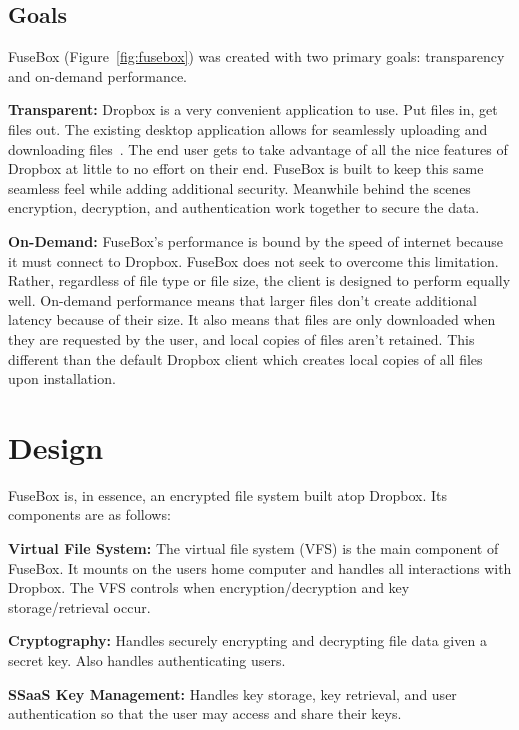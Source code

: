 \documentclass[11pt,twocolumn,letterpaper]{article}
\newcommand{\appname}{FuseBox }
\newcommand{\appnameWOspace}{FuseBox}
\begin{document}
\subsection{Goals}
\label{sec:goals}
\appname (Figure~\ref{fig:fusebox}) was created with two primary goals: transparency and
on-demand performance. 
\par {\bf Transparent:} Dropbox is a very convenient application to
use. Put files in, get files out. The existing desktop application
allows for seamlessly uploading and downloading files~\cite{dropboxclient}. The end user
gets to take advantage of all the nice features of Dropbox at little
to no effort on their end. \appname is built to keep this same 
seamless feel while adding additional security. Meanwhile behind the
scenes encryption, decryption, and authentication work together to
secure the data.     
\par {\bf On-Demand:} \appnameWOspace's performance is bound by
the speed of internet because it must connect to Dropbox. 
\appname does not seek to overcome this
limitation. Rather, regardless of file type or file size, the client
is designed to perform equally well. On-demand performance means that
larger files don't create additional latency because of their
size. It also means that files are only downloaded when they are requested
by the user, and local copies of files aren't retained. This different 
than the default Dropbox client which
creates local copies of all files upon installation. 

\section{Design}
\label{sec:design}
\appname is, in essence, an encrypted file system built atop
Dropbox. Its components are as follows:
\par {\bf Virtual File System:} The virtual file system (VFS) is the main component of 
\appnameWOspace. It mounts on the users home computer and handles 
all interactions with Dropbox. The VFS controls when
encryption/decryption and key storage/retrieval occur.   
\par {\bf Cryptography:} Handles securely encrypting and decrypting file data
given a secret key. Also handles authenticating users. 
\par {\bf SSaaS Key Management:} Handles key storage, key retrieval, and user
authentication so that the user may access and share their keys. 
\end{document}
